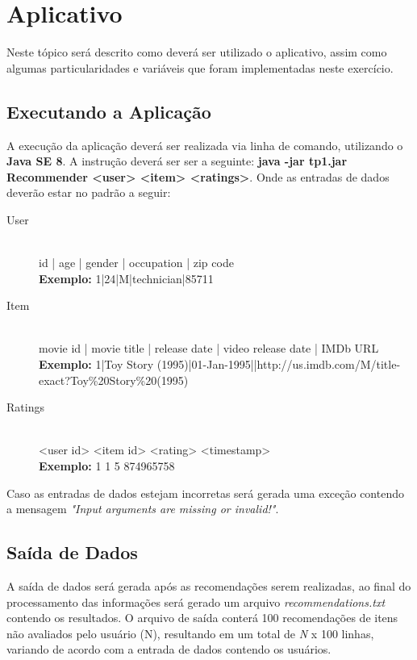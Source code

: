 \documentclass[12pt]{article}
\begin{document}
\section{Aplicativo} \label{sec:aplicativo}

Neste tópico será descrito como deverá ser utilizado o aplicativo, assim como algumas particularidades e variáveis que foram implementadas neste exercício.

\subsection{Executando a Aplicação}

A execução da aplicação deverá ser realizada via linha de comando, utilizando o \textbf{Java SE 8}. A instrução deverá ser ser a seguinte: \textbf{java -jar tp1.jar Recommender <user> <item> <ratings>}. Onde as entradas de dados deverão estar no padrão a seguir:
\vspace{5 mm}
\begin{description}
\item[User] \hfill \\
id | age | gender | occupation | zip code \\
\textbf{Exemplo:} 1|24|M|technician|85711
\item[Item] \hfill \\
movie id | movie title | release date | video release date | IMDb URL \\
\textbf{Exemplo:} 1|Toy Story (1995)|01-Jan-1995||http://us.imdb.com/M/title-exact?Toy\%20Story\%20(1995)
\item[Ratings] \hfill \\
<user id> <item id> <rating> <timestamp> \\
\textbf{Exemplo:} 1	1	5	874965758

\end{description}
\vspace{5 mm}
\noindent
Caso as entradas de dados estejam incorretas será gerada uma exceção contendo a mensagem \textit{"Input arguments are missing or invalid!"}.

\subsection{Saída de Dados}

A saída de dados será gerada após as recomendações serem realizadas, ao final do processamento das informações será gerado um arquivo \textit{recommendations.txt} contendo os resultados. O arquivo de saída conterá 100 recomendações de itens não avaliados pelo usuário (N), resultando em um total de \textit{N} x 100 linhas, variando de acordo com a entrada de dados contendo os usuários. 
\end{document}
